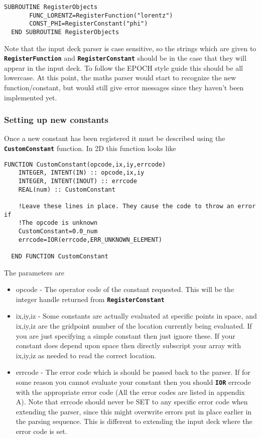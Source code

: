 \documentclass[12pt]{article}
\newcommand{\simpleboxverbatim}{\begin{Verbatim}[obeytabs=true,frame=single,
  framerule=0.5mm,rulecolor=\color{warwickmid}]}
\newcommand{\inlinecode}[1]{{\color{warwickred} \bf\texttt{#1}}}
\newcommand{\EPOCH}{{\color{warwickdark}\fontfamily{phv}\selectfont EPOCH} }
\begin{document}
\simpleboxverbatim
  SUBROUTINE RegisterObjects
       FUNC_LORENTZ=RegisterFunction("lorentz")
       CONST_PHI=RegisterConstant("phi")
  END SUBROUTINE RegisterObjects
\end{Verbatim}

Note that the input deck parser is case sensitive, so the strings which are
given to \inlinecode{RegisterFunction} and \inlinecode{RegisterConstant}
should be in the case that they will appear in the input deck. To follow the
\EPOCH style guide this should be all lowercase. At this point, the maths
parser would start to recognize the new function/constant, but would still
give error messages since they haven't been implemented yet.

\subsubsection{Setting up new constants}

Once a new constant has been registered it must be described using the
\inlinecode{CustomConstant} function. In 2D this function looks like

\simpleboxverbatim
  FUNCTION CustomConstant(opcode,ix,iy,errcode)
    INTEGER, INTENT(IN) :: opcode,ix,iy
    INTEGER, INTENT(INOUT) :: errcode
    REAL(num) :: CustomConstant

    !Leave these lines in place. They cause the code to throw an error if
    !The opcode is unknown
    CustomConstant=0.0_num
    errcode=IOR(errcode,ERR_UNKNOWN_ELEMENT)

  END FUNCTION CustomConstant
\end{Verbatim}

The parameters are

\begin{itemize}
\item opcode - The operator code of the constant requested. This will be the
  integer handle returned from \inlinecode{RegisterConstant}
\item ix,iy,iz - Some constants are actually evaluated at specific points in
  space, and ix,iy,iz are the gridpoint number of the location currently being
  evaluated. If you are just specifying a simple constant then just ignore
  these. If your constant does depend upon space then directly subscript your
  array with ix,iy,iz as needed to read the correct location.
\item errcode - The error code which is should be passed back to the
  parser. If for some reason you cannot evaluate your constant then you should
  \inlinecode{IOR} errcode with the appropriate error code (All the error
  codes are listed in appendix A). Note that errcode should never be SET to
  any specific error code when extending the parser, since this might
  overwrite errors put in place earlier in the parsing sequence. This is
  different to extending the input deck where the error code is set.
\end{itemize}
\end{document}
